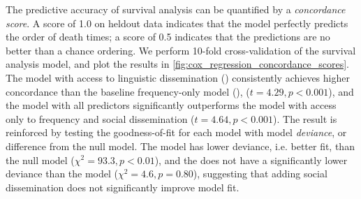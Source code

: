 The predictive accuracy of survival analysis can be quantified by a \emph{concordance score}. A score of 1.0 on heldout data indicates that the model perfectly predicts the order of death times; a score of 0.5 indicates that the predictions are no better than a chance ordering. We perform 10-fold cross-validation of the survival analysis model, and plot the results in \autoref{fig:cox_regression_concordance_scores}.
The model with access to linguistic dissemination () consistently achieves higher concordance than the baseline frequency-only model (), 
($t=4.29, p<0.001$), and the model with all predictors  significantly outperforms the model with access only to frequency and social dissemination  ($t=4.64, p<0.001$).
The result is reinforced by testing the goodness-of-fit for each model with model \emph{deviance}, or difference from the null model. 
The  model has lower deviance, i.e. better fit, than the null model ($\chi^{2}=93.3, p < 0.01$), and the  does not have a significantly lower deviance than the  model ($\chi^{2}=4.6, p=0.80$), suggesting that adding social dissemination does not significantly improve model fit.

